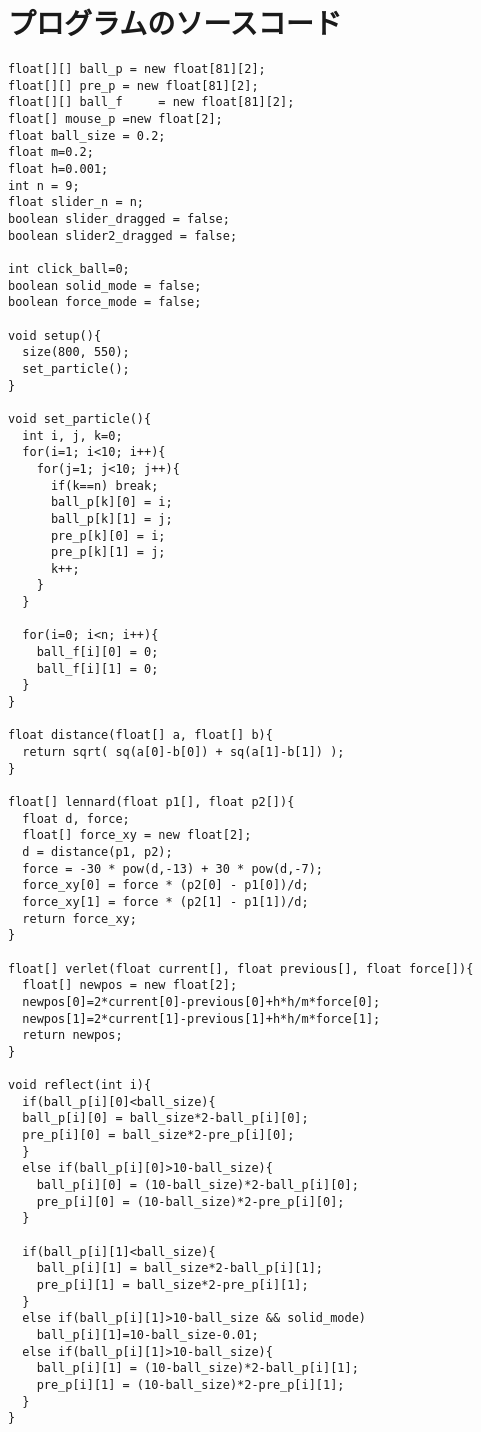\appendix
\chapter{プログラムのソースコード}

\begin{framed}
{\small
\begin{verbatim}
float[][] ball_p = new float[81][2];
float[][] pre_p = new float[81][2];
float[][] ball_f	 = new float[81][2];
float[] mouse_p =new float[2];
float ball_size = 0.2;
float m=0.2;
float h=0.001;
int n = 9;
float slider_n = n;
boolean slider_dragged = false;
boolean slider2_dragged = false;

int click_ball=0;
boolean solid_mode = false;
boolean force_mode = false;

void setup(){
  size(800, 550);
  set_particle();
}

void set_particle(){
  int i, j, k=0;
  for(i=1; i<10; i++){
    for(j=1; j<10; j++){
      if(k==n) break;
      ball_p[k][0] = i;
      ball_p[k][1] = j;
      pre_p[k][0] = i;
      pre_p[k][1] = j;
      k++;
    }
  }

  for(i=0; i<n; i++){
    ball_f[i][0] = 0; 
    ball_f[i][1] = 0;
  } 
}

float distance(float[] a, float[] b){
  return sqrt( sq(a[0]-b[0]) + sq(a[1]-b[1]) );
}

float[] lennard(float p1[], float p2[]){
  float d, force;
  float[] force_xy = new float[2];
  d = distance(p1, p2);
  force = -30 * pow(d,-13) + 30 * pow(d,-7);
  force_xy[0] = force * (p2[0] - p1[0])/d; 
  force_xy[1] = force * (p2[1] - p1[1])/d;
  return force_xy;  
}

float[] verlet(float current[], float previous[], float force[]){
  float[] newpos = new float[2];
  newpos[0]=2*current[0]-previous[0]+h*h/m*force[0];
  newpos[1]=2*current[1]-previous[1]+h*h/m*force[1];
  return newpos;
} 

void reflect(int i){
  if(ball_p[i][0]<ball_size){
  ball_p[i][0] = ball_size*2-ball_p[i][0];
  pre_p[i][0] = ball_size*2-pre_p[i][0];
  }  
  else if(ball_p[i][0]>10-ball_size){
    ball_p[i][0] = (10-ball_size)*2-ball_p[i][0];
    pre_p[i][0] = (10-ball_size)*2-pre_p[i][0];
  }
    
  if(ball_p[i][1]<ball_size){
    ball_p[i][1] = ball_size*2-ball_p[i][1];
    pre_p[i][1] = ball_size*2-pre_p[i][1];
  }
  else if(ball_p[i][1]>10-ball_size && solid_mode)
    ball_p[i][1]=10-ball_size-0.01;
  else if(ball_p[i][1]>10-ball_size){
    ball_p[i][1] = (10-ball_size)*2-ball_p[i][1];
    pre_p[i][1] = (10-ball_size)*2-pre_p[i][1];
  }
}


\end{verbatim}}
\end{framed}
